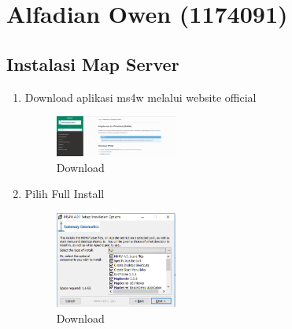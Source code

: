 \section{Alfadian Owen (1174091)}
\subsection{Instalasi Map Server}
\begin{enumerate}
    \item Download aplikasi ms4w melalui website official
    \hfill\break
    \begin{figure}[H]
		\includegraphics[width=4cm]{figures/tugas4/1174091/1.png}
		\centering
		\caption{Download}
    \end{figure}
    \hfill\break

    \item Pilih Full Install
    \hfill\break
    \begin{figure}[H]
		\includegraphics[width=4cm]{figures/tugas4/1174091/2.png}
		\centering
		\caption{Download}
    \end{figure}
    \hfill\break

\end{enumerate}


